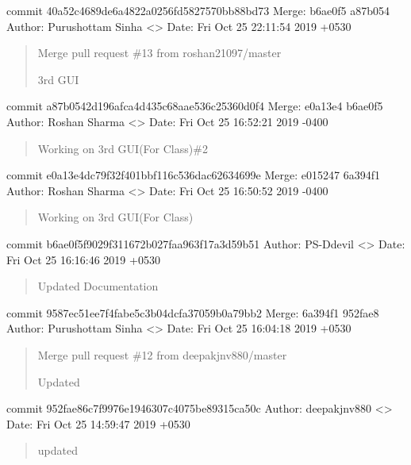 \documentclass[letterpaper,10pt,english]{sphinxmanual}
\begin{document}
commit 40a52c4689de6a4822a0256fd5827570bb88bd73
Merge: b6ae0f5 a87b054
Author: Purushottam Sinha \textless{}\textgreater{}
Date:   Fri Oct 25 22:11:54 2019 +0530
\begin{quote}

Merge pull request \#13 from roshan21097/master

3rd GUI
\end{quote}

commit a87b0542d196afca4d435c68aae536c25360d0f4
Merge: e0a13e4 b6ae0f5
Author: Roshan Sharma \textless{}\textgreater{}
Date:   Fri Oct 25 16:52:21 2019 -0400
\begin{quote}

Working on 3rd GUI(For Class)\#2
\end{quote}

commit e0a13e4dc79f32f401bbf116c536dac62634699e
Merge: e015247 6a394f1
Author: Roshan Sharma \textless{}\textgreater{}
Date:   Fri Oct 25 16:50:52 2019 -0400
\begin{quote}

Working on 3rd GUI(For Class)
\end{quote}

commit b6ae0f5f9029f311672b027faa963f17a3d59b51
Author: PS-Ddevil \textless{}\textgreater{}
Date:   Fri Oct 25 16:16:46 2019 +0530
\begin{quote}

Updated Documentation
\end{quote}

commit 9587ec51ee7f4fabe5c3b04dcfa37059b0a79bb2
Merge: 6a394f1 952fae8
Author: Purushottam Sinha \textless{}\textgreater{}
Date:   Fri Oct 25 16:04:18 2019 +0530
\begin{quote}

Merge pull request \#12 from deepakjnv880/master

Updated
\end{quote}

commit 952fae86c7f9976e1946307c4075be89315ca50c
Author: deepakjnv880 \textless{}\textgreater{}
Date:   Fri Oct 25 14:59:47 2019 +0530
\begin{quote}

updated
\end{quote}
\end{document}
